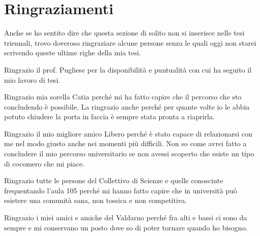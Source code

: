 \chapter*{Ringraziamenti}
{}
Anche se ho sentito dire che questa sezione di solito non si inserisce nelle tesi triennali, trovo doveroso ringraziare alcune persone senza le quali oggi non starei scrivendo queste ultime righe della mia tesi.\par
Ringrazio il prof. Pugliese per la disponibilità e puntualità con cui ha seguito il mio lavoro di tesi.\par
Ringrazio mia sorella Catia perché mi ha fatto capire che il percorso che sto concludendo è possibile. La ringrazio anche perché per quante volte io le abbia potuto chiudere la porta in faccia è sempre stata pronta a riaprirla.\par
Ringrazio il mio migliore amico Libero perché è stato capace di relazionarsi con me nel modo giusto anche nei momenti più difficili. Non so come avrei fatto a concludere il mio percorso universitario se non avessi scoperto che esiste un tipo di cocomero che mi piace.\par
Ringrazio tutte le persone del Collettivo di Scienze e quelle conosciute frequentando l'aula 105 perché mi hanno fatto capire che in università può esistere una comunità sana, non tossica e non competitiva.\par
Ringrazio i miei amici e amiche del Valdarno perché fra alti e bassi ci sono da sempre e mi conservano un posto dove so di poter tornare quando ho bisogno.